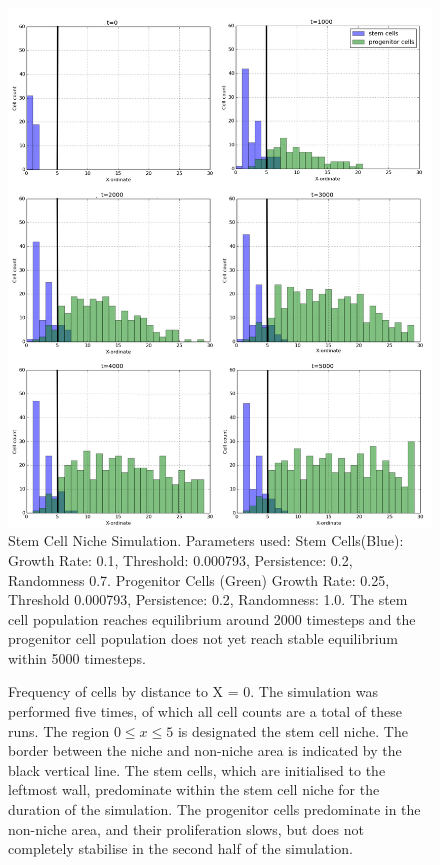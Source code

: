 \documentclass[12pt]{article}
\begin{document}
\begin{figure}[H]
\centering
\includegraphics[width=14.51cm]{media/6sim.png}
\caption{Stem Cell Niche Simulation. 
Parameters used: Stem Cells(Blue): Growth Rate: 0.1, Threshold: 
0.000793, Persistence: 0.2, Randomness 0.7. Progenitor Cells (Green) 
Growth Rate: 0.25, Threshold 0.000793, Persistence: 0.2, Randomness: 
1.0. The stem cell population reaches equilibrium around 2000 timesteps 
and the progenitor cell population does not yet reach stable equilibrium 
within 5000 timesteps.}
\end{figure}

\begin{figure}[H]
\centering

\caption{Frequency of cells by distance 
to X = 0. The simulation was performed five times, of which all cell 
counts are a total of these runs. The region \(0 \leq x \leq 5\) is 
designated the stem cell niche. The border between the niche and 
non-niche area is indicated by the black vertical line. The stem cells, 
which are initialised to the leftmost wall, predominate within the stem 
cell niche for the duration of the simulation. The progenitor cells 
predominate in the non-niche area, and their proliferation slows, but 
does not completely stabilise in the second half of the simulation.}
\end{figure}
\end{document}
